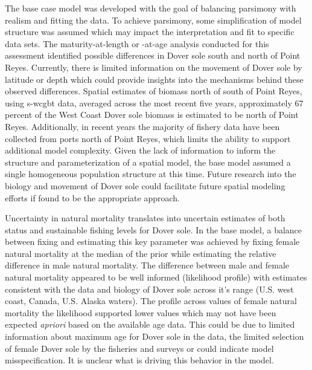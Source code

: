 \documentclass[11pt,
  english,
  a4paper,
]{article}
\begin{document}
\leavevmode\tagmcend\tagstructend


The base case model was developed with the goal of balancing parsimony with realism and fitting the data. To achieve parsimony, some simplification of model structure was assumed which may impact the interpretation and fit to specific data sets. The maturity-at-length or -at-age analysis conducted for this assessment identified possible differences in Dover sole south and north of Point Reyes. Currently, there is limited information on the movement of Dover sole by latitude or depth which could provide insights into the mechanisms behind these observed differences. Spatial estimates of biomass north of south of Point Reyes, using \gls{s-wcgbt} data, averaged across the most recent five years, approximately 67 percent of the West Coast Dover sole biomass is estimated to be north of Point Reyes. Additionally, in recent years the majority of fishery data have been collected from ports north of Point Reyes, which limits the ability to support additional model complexity. Given the lack of information to inform the structure and parameterization of a spatial model, the base model assumed a single homogeneous population structure at this time. Future research into the biology and movement of Dover sole could facilitate future spatial modeling efforts if found to be the appropriate approach.

\leavevmode\tagmcend\tagstructend\par


Uncertainty in natural mortality translates into uncertain estimates of both status and sustainable fishing levels for Dover sole. In the base model, a balance between fixing and estimating this key parameter was achieved by fixing female natural mortality at the median of the prior while estimating the relative difference in male natural mortality. The difference between male and female natural mortality appeared to be well informed (likelihood profile) with estimates consistent with the data and biology of Dover sole across it's range (U.S. west coast, Canada, U.S. Alaska waters). The profile across values of female natural mortality the likelihood supported lower values which may not have been expected \emph{apriori} based on the available age data. This could be due to limited information about maximum age for Dover sole in the data, the limited selection of female Dover sole by the fisheries and surveys or could indicate model misspecification. It is unclear what is driving this behavior in the model.
\end{document}
